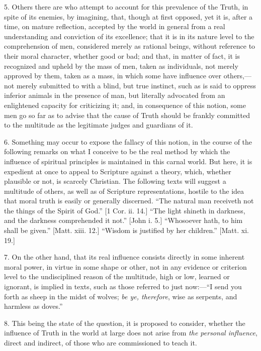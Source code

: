 5. Others there are who attempt to account for this prevalence of
the Truth, in spite of its enemies, by imagining, that, though at
first opposed, yet it is, after a time, on mature reflection, accepted
by the world in general from a real understanding and conviction of
its excellence; that it is in its nature level to the comprehension of
men, considered merely as rational beings, without reference to their
moral character, whether good or bad; and that, in matter of fact, it
is recognized and upheld by the mass of men, taken as individuals, not
merely approved by them, taken as a mass, in which some have influence
over others,—not merely submitted to with a blind, but true
instinct, such as is said to oppress inferior animals in the presence
of man, but literally advocated from an enlightened capacity for
criticizing it; and, in consequence of this notion, some men go so far
as to advise that the cause of Truth should be frankly committed to
the multitude as the legitimate judges and guardians of it.

6. Something may occur to expose the fallacy of this notion, in the
course of the following remarks on what I conceive to be the real
method by which the influence of spiritual principles is maintained in
this carnal world. But here, it is expedient at once to appeal to
Scripture against a theory, which, whether plausible or not, is
scarcely Christian. The following texts will suggest a multitude of
others, as well as of Scripture representations, hostile to the idea
that moral truth is easily or generally discerned. ``The natural
man receiveth not the things of the Spirit of God.'' [1 Cor. ii.
14.] ``The light shineth in darkness, and the darkness
comprehended it not.'' [John i. 5.] ``Whosoever hath, to him
shall be given.'' [Matt. xiii. 12.] ``Wisdom is justified by
her children.'' [Matt. xi. 19.]

7. On the other hand, that its real influence consists directly in
some inherent moral power, in virtue in some shape or other, not in
any evidence or criterion level to the undisciplined reason of the
multitude, high or low, learned or ignorant, is implied in texts, such
as those referred to just now:—``I send you forth as sheep in
the midst of wolves; \emph{be ye, therefore}, wise as serpents, and
harmless as doves.''

8. This being the state of the question, it is proposed to
consider, whether the influence of Truth in the world at large does
not arise from \emph{the personal influence}, direct and indirect, of
those who are commissioned to teach it.

